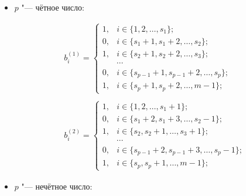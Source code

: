 
\begin{itemize}

\item $p$ "--- чётное число:

\begin{equation}\label{tri:devyat:odin}

\begin{array}{l}

b_i^{(1)}=

\begin{cases}

1, & i\in\{1, 2,\dots,s_1\};\\

0, & i\in\{s_1+1,s_1+2,\dots,s_2\};\\

1, & i\in\{s_2+1,s_2+2,\dots,s_3\};\\

& \cdots \\

0, & i\in\{s_{p-1}+1,s_{p-1}+2,\dots,s_p\};\\

1, & i\in\{s_p+1,s_p+2,\dots,m-1\};

\end{cases}\\

\\

b_i^{(2)}=

\begin{cases}

1, & i\in\{1, 2,\dots,s_1+1\};\\

0, & i\in\{s_1+2,s_1+3,\dots,s_2-1\};\\

1, & i\in\{s_2,s_2+1,\dots,s_3+1\};\\

& \cdots \\

0, & i\in\{s_{p-1}+2,s_{p-1}+3,\dots,s_p-1\};\\

1, & i\in\{s_p,s_p+1,\dots,m-1\};

\end{cases}

\end{array}

\end{equation}

\item $p$ "--- нечётное число:


\end{itemize}
